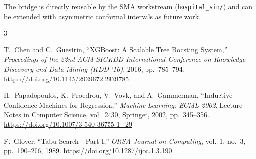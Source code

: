 \documentclass[11pt,a4paper]{article}
\begin{document}
The bridge is directly reusable by the SMA workstream (\texttt{hospital\_sim/}) and can be extended with asymmetric conformal intervals as future work.

\begin{thebibliography}{3}

T.~Chen and C.~Guestrin, ``XGBoost: A Scalable Tree Boosting System,''
\emph{Proceedings of the 22nd ACM SIGKDD International Conference on Knowledge Discovery and Data Mining (KDD '16)}, 2016, pp.~785--794.
\url{https://doi.org/10.1145/2939672.2939785}

H.~Papadopoulos, K.~Proedrou, V.~Vovk, and A.~Gammerman, ``Inductive Confidence Machines for Regression,''
\emph{Machine Learning: ECML 2002}, Lecture Notes in Computer Science, vol.~2430, Springer, 2002, pp.~345--356.
\url{https://doi.org/10.1007/3-540-36755-1_29}

F.~Glover, ``Tabu Search---Part I,''
\emph{ORSA Journal on Computing}, vol.~1, no.~3, pp.~190--206, 1989.
\url{https://doi.org/10.1287/ijoc.1.3.190}

\end{thebibliography}
\end{document}
